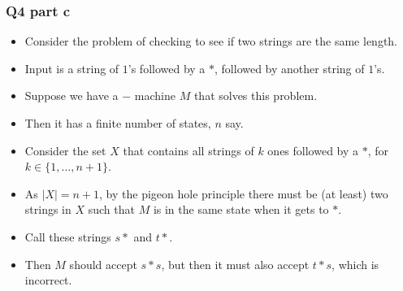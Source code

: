 \documentclass[handout]{beamer}
\begin{document}
\begin{frame}
\frametitle{Q4 part c}
\begin{itemize}
\item Consider the problem of checking to see if two strings are the same length. 
\item Input is a string of $1$'s followed by a $*$, followed by another string of $1$'s. 
\item Suppose we have a $-$ machine $M$ that solves this problem. 
\item Then it has a finite number of states, $n$ say. 
\item Consider the set $X$ that contains all strings of $k$ ones followed by a $*$, for $k\in\{1,\ldots,n+1\}$. 
\item As $|X| = n+1$, by the pigeon hole principle there must be (at least) two strings in $X$ such that $M$ is in the same state when it gets to $*$. 
\item Call these strings $s*$ and $t*$. 
\item Then $M$ should accept $s*s$, but then it must also accept $t*s$, which is incorrect. 
\end{itemize}

\end{frame}
\end{document}
